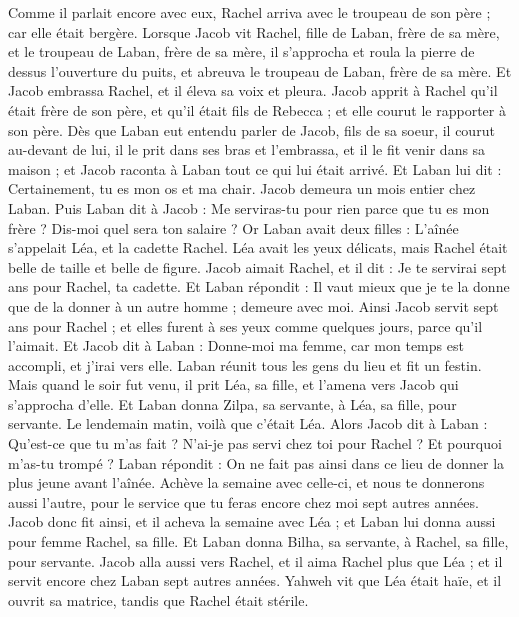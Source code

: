 \begin{multicols}{2}
Comme il parlait encore avec eux, Rachel arriva avec le troupeau de son père ; car elle était bergère.
Lorsque Jacob vit Rachel, fille de Laban, frère de sa mère, et le troupeau de Laban, frère de sa mère, il s'approcha et roula la pierre de dessus l'ouverture du puits, et abreuva le troupeau de Laban, frère de sa mère.
Et Jacob embrassa Rachel, et il éleva sa voix et pleura.
Jacob apprit à Rachel qu'il était frère de son père, et qu'il était fils de Rebecca ; et elle courut le rapporter à son père.
Dès que Laban eut entendu parler de Jacob, fils de sa soeur, il courut au-devant de lui, il le prit dans ses bras et l’embrassa, et il le fit venir dans sa maison ; et Jacob raconta à Laban tout ce qui lui était arrivé.
Et Laban lui dit : Certainement, tu es mon os et ma chair. Jacob demeura un mois entier chez Laban.
Puis Laban dit à Jacob : Me serviras-tu pour rien parce que tu es mon frère ? Dis-moi quel sera ton salaire ?
Or Laban avait deux filles : L'aînée s'appelait Léa, et la cadette Rachel.
Léa avait les yeux délicats, mais Rachel était belle de taille et belle de figure.
Jacob aimait Rachel, et il dit : Je te servirai sept ans pour Rachel, ta cadette.
Et Laban répondit : Il vaut mieux que je te la donne que de la donner à un autre homme ; demeure avec moi.
Ainsi Jacob servit sept ans pour Rachel ; et elles furent à ses yeux comme quelques jours, parce qu'il l'aimait.
Et Jacob dit à Laban : Donne-moi ma femme, car mon temps est accompli, et j’irai vers elle.
Laban réunit tous les gens du lieu et fit un festin.
Mais quand le soir fut venu, il prit Léa, sa fille, et l'amena vers Jacob qui s’approcha d’elle.
Et Laban donna Zilpa, sa servante, à Léa, sa fille, pour servante.
Le lendemain matin, voilà que c'était Léa. Alors Jacob dit à Laban : Qu'est-ce que tu m'as fait ? N'ai-je pas servi chez toi pour Rachel ? Et pourquoi m'as-tu trompé ?
Laban répondit : On ne fait pas ainsi dans ce lieu de donner la plus jeune avant l'aînée.
Achève la semaine avec celle-ci, et nous te donnerons aussi l'autre, pour le service que tu feras encore chez moi sept autres années.
Jacob donc fit ainsi, et il acheva la semaine avec Léa ; et Laban lui donna aussi pour femme Rachel, sa fille.
Et Laban donna Bilha, sa servante, à Rachel, sa fille, pour servante.
Jacob alla aussi vers Rachel, et il aima Rachel plus que Léa ; et il servit encore chez Laban sept autres années.
Yahweh vit que Léa était haïe, et il ouvrit sa matrice, tandis que Rachel était stérile.

\end{multicols}
